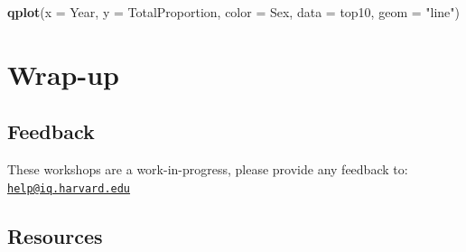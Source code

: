 \documentclass[]{book}
\newenvironment{Shaded}{\begin{snugshade}}{\end{snugshade}}
\newcommand{\KeywordTok}[1]{\textcolor[rgb]{0.13,0.29,0.53}{\textbf{#1}}}
\newcommand{\DataTypeTok}[1]{\textcolor[rgb]{0.13,0.29,0.53}{#1}}
\newcommand{\StringTok}[1]{\textcolor[rgb]{0.31,0.60,0.02}{#1}}
\newcommand{\NormalTok}[1]{#1}
\begin{document}
\begin{Shaded}
\begin{Highlighting}[]
\KeywordTok{qplot}\NormalTok{(}\DataTypeTok{x =}\NormalTok{ Year, }
      \DataTypeTok{y =}\NormalTok{ TotalProportion, }
      \DataTypeTok{color =}\NormalTok{ Sex,}
      \DataTypeTok{data =}\NormalTok{ top10,}
      \DataTypeTok{geom =} \StringTok{"line"}\NormalTok{)}
\end{Highlighting}
\end{Shaded}

\section{Wrap-up}\label{wrap-up-1}

\subsection{Feedback}\label{feedback-1}

These workshops are a work-in-progress, please provide any feedback to:
\href{mailto:help@iq.harvard.edu}{\nolinkurl{help@iq.harvard.edu}}

\subsection{Resources}\label{resources-1}
\end{document}
